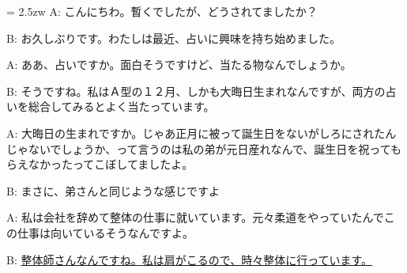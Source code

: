 \documentclass[11pt]{amsart}
\title{}
\author{}
\newenvironment{hangall}[1]{\hangindent = 2.5zw\everypar{\hangindent = 2.5zw}}{}
\begin{document}
\maketitle
\begin{hangall}{}%
A: こんにちわ。暫くでしたが、どうされてましたか？

B: お久しぶりです。わたしは最近、占いに興味を持ち始めました。

A: ああ、占いですか。面白そうですけど、当たる物なんでしょうか。

B: そうですね。私はＡ型の１２月、しかも大晦日生まれなんですが、両方の占いを総合してみるとよく当たっています。

A: 大晦日の生まれですか。じゃあ正月に被って誕生日をないがしろにされたんじゃないでしょうか、って言うのは私の弟が元日産れなんで、誕生日を祝ってもらえなかったってこぼしてましたよ。

B: まさに、弟さんと同じような感じですよ

A: 私は会社を辞めて整体の仕事に就いています。元々柔道をやっていたんでこの仕事は向いているそうなんですよ。

B: \ul{整体師さんなんですね。私は肩がこるので、時々整体に行っています。}\end{hangall}
\end{document}
